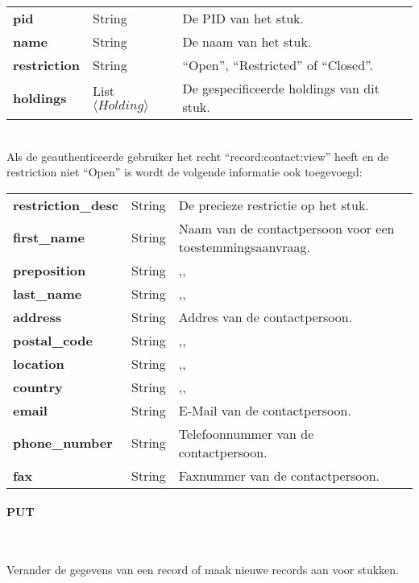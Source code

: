 \documentclass[a4paper,titlepage]{report}
\makeatletter
\def\namedlabel#1#2{
  \label{#1}
  \begingroup
   \def\@currentlabel{#2}%
   \label{#1:name}\endgroup
}
\makeatother
\begin{document}
            \begin{tabular}{ l l p{10cm} }
              \textbf{pid} & String & De PID van het stuk. \\
              \textbf{name} & String & De naam van het stuk. \\
              \textbf{restriction} & String & ``Open'', ``Restricted'' of ``Closed''. \\
              \textbf{holdings} & List$\langle Holding \rangle$ & De
              gespecificeerde holdings
              van dit stuk.\\
            \end{tabular}\hfill\\

            Als de geauthenticeerde gebruiker het recht ``record:contact:view''
            heeft en de restriction niet ``Open'' is wordt de volgende
            informatie ook toegevoegd:\\

            \begin{tabular}{ l l p{10cm} }
              \textbf{restriction\_desc} & String & De precieze restrictie op
              het stuk.\\
              \textbf{first\_name} & String & Naam van de contactpersoon voor
              een toestemmingsaanvraag. \\
              \textbf{preposition} & String & ,,\\
              \textbf{last\_name} & String & ,,\\
              \textbf{address} & String & Addres van de contactpersoon.\\
              \textbf{postal\_code} & String & ,,\\
              \textbf{location} & String & ,,\\
              \textbf{country} & String & ,,\\
              \textbf{email} & String & E-Mail van de contactpersoon.\\
              \textbf{phone\_number} & String & Telefoonnummer van de
              contactpersoon.\\
              \textbf{fax} & String & Faxnummer van de contactpersoon.\\
            \end{tabular}

        \paragraph{PUT}\hfill\\
          \namedlabel{api:record:put}{PUT /record/[pid,pid,pid,\ldots]}
          Verander de gegevens van een record of maak nieuwe records aan voor
          stukken.
\end{document}
